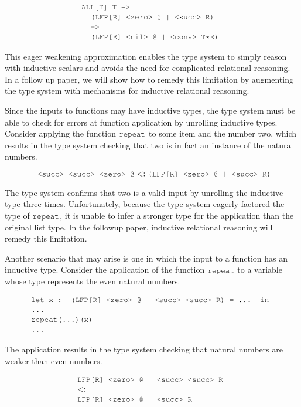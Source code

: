 \documentclass[acmsmall]{acmart}
\theoremstyle{definition}
\begin{document}
\[
  \begin{array}[t]{@{} l}
      \J{ALL[T] T ->} 
      \\
      \I \J{(LFP[R] <zero> @ | <succ> R)}
      \\
      \I \J{->}
      \\
      \I \J{(LFP[R] <nil> @ | <cons> T*R)}
  \end{array}
\]

\noindent
This eager weakening approximation enables the type system
to simply reason with inductive scalars and avoids the need for complicated
relational reasoning. In a follow up paper,
we will show how to remedy this limitation by augmenting the type system with
mechanisms for inductive relational reasoning.

Since the inputs to functions may have inductive types, the type 
system must be able to check for errors at function application by unrolling
inductive types.
Consider applying the function $\J{repeat}$ to some item and the number two, 
which results in the type system checking that two is in fact an instance of the natural numbers.

\[
  \J{ <succ> <succ> <zero> @} \subtypes \J{(LFP[R] <zero> @ | <succ> R)}
\]

\noindent
The type system confirms that two is a valid input by unrolling the inductive type three times.
Unfortunately, because the type system eagerly factored the type of $\J{repeat}$, it
is unable to infer a stronger type for the application than the original list type. 
In the followup paper, inductive relational reasoning will remedy this limitation.


Another scenario that may arise is one in which the input to a function has an inductive type.
Consider the application of the function $\J{repeat}$ to a variable whose type represents the even natural numbers.

\[
  \begin{array}[t]{@{} l}
    \J{let x : (LFP[R] <zero> @ | <succ> <succ> R) = ... in}
    \\
    \J{...}
    \\
    \J{repeat(...)(x)} 
    \\
    \J{...}
  \end{array}
\]

\noindent
The application results in the type system checking that natural numbers are weaker than even numbers. 

\[
  \begin{array}[t]{@{} l}
    \J{LFP[R] <zero> @ | <succ> <succ> R}
    \\
    \subtypes
    \\
    \J{LFP[R] <zero> @ | <succ> R}
  \end{array}
\]
\end{document}
